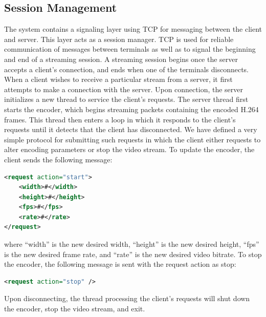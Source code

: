 \subsection{Session Management}
\label{sec:SessionManagement}
The system contains a signaling layer using TCP for messaging between the client and server. This layer acts as a session manager. TCP is used for reliable communication of messages between terminals as well as to signal the beginning and end of a streaming session. A streaming session begins once the server accepts a client's connection, and ends when one of the terminals disconnects. When a client wishes to receive a particular stream from a server, it first attempts to make a connection with the server. Upon connection, the server initializes a new thread to service the client's requests. The server thread first starts the encoder, which begins streaming packets containing the encoded H.264 frames. This thread then enters a loop in which it responds to the client's requests until it detects that the client has disconnected. We have defined a very simple protocol for submitting such requests in which the client either requests to alter encoding parameters or stop the video stream. To update the encoder, the client sends the following message:
%
\begin{lstlisting}[language=xml, frame=single]
<request action="start">
	<width>#</width>
	<height>#</height>
	<fps>#</fps>
	<rate>#</rate>
</request>
\end{lstlisting}
where ``width'' is the new desired width, ``height'' is the new desired height, ``fps'' is the new desired frame rate, and ``rate'' is the new desired video bitrate. To stop the encoder, the following message is sent with the request action as stop:
%
\begin{lstlisting}[language=xml, frame=single]
<request action="stop" />
\end{lstlisting}
Upon disconnecting, the thread processing the client's requests will shut down the encoder, stop the video stream, and exit.

